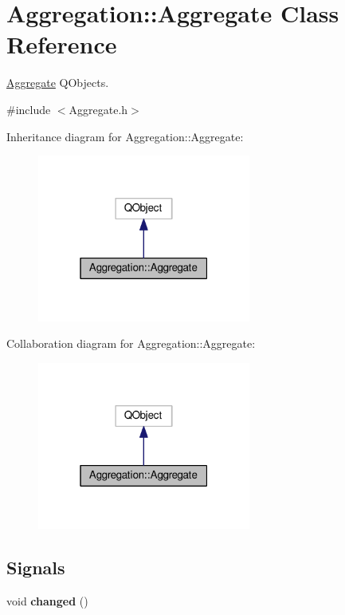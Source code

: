\hypertarget{classAggregation_1_1Aggregate}{}\section{Aggregation\+:\+:Aggregate Class Reference}
\label{classAggregation_1_1Aggregate}


\hyperlink{classAggregation_1_1Aggregate}{Aggregate} Q\+Objects.  




{\ttfamily \#include $<$Aggregate.\+h$>$}



Inheritance diagram for Aggregation\+:\+:Aggregate\+:\nopagebreak
\begin{figure}[H]
\begin{center}
\leavevmode
\includegraphics[width=199pt]{classAggregation_1_1Aggregate__inherit__graph}
\end{center}
\end{figure}


Collaboration diagram for Aggregation\+:\+:Aggregate\+:\nopagebreak
\begin{figure}[H]
\begin{center}
\leavevmode
\includegraphics[width=199pt]{classAggregation_1_1Aggregate__coll__graph}
\end{center}
\end{figure}
\subsection*{Signals}
\begin{DoxyCompactItemize}
\item 
void {\bfseries changed} ()\hypertarget{classAggregation_1_1Aggregate_af6701c59df97729db21ac2641ff31d27}{}\label{classAggregation_1_1Aggregate_af6701c59df97729db21ac2641ff31d27}

\end{DoxyCompactItemize}
